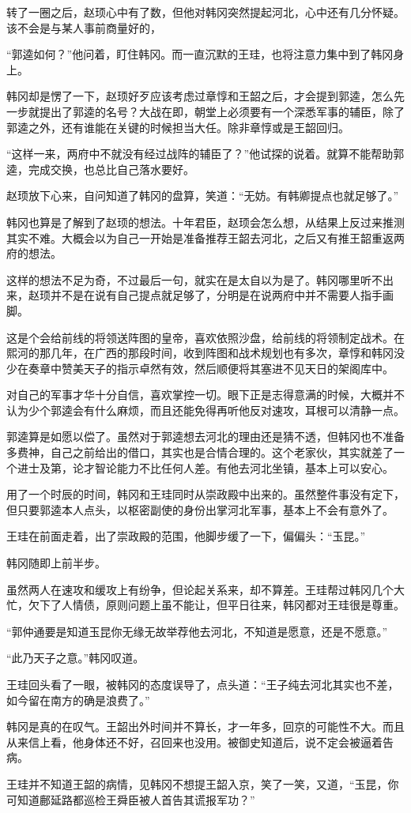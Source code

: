 转了一圈之后，赵顼心中有了数，但他对韩冈突然提起河北，心中还有几分怀疑。该不会是与某人事前商量好的，

“郭逵如何？”他问着，盯住韩冈。而一直沉默的王珪，也将注意力集中到了韩冈身上。

韩冈却是愣了一下，赵顼好歹应该考虑过章惇和王韶之后，才会提到郭逵，怎么先一步就提出了郭逵的名号？大战在即，朝堂上必须要有一个深悉军事的辅臣，除了郭逵之外，还有谁能在关键的时候担当大任。除非章惇或是王韶回归。

“这样一来，两府中不就没有经过战阵的辅臣了？”他试探的说着。就算不能帮助郭逵，完成交换，也总比自己落水要好。

赵顼放下心来，自问知道了韩冈的盘算，笑道：“无妨。有韩卿提点也就足够了。”

韩冈也算是了解到了赵顼的想法。十年君臣，赵顼会怎么想，从结果上反过来推测其实不难。大概会以为自己一开始是准备推荐王韶去河北，之后又有推王韶重返两府的想法。

这样的想法不足为奇，不过最后一句，就实在是太自以为是了。韩冈哪里听不出来，赵顼并不是在说有自己提点就足够了，分明是在说两府中并不需要人指手画脚。

这是个会给前线的将领送阵图的皇帝，喜欢依照沙盘，给前线的将领制定战术。在熙河的那几年，在广西的那段时间，收到阵图和战术规划也有多次，章惇和韩冈没少在奏章中赞美天子的指示卓然有效，然后顺便将其塞进不见天日的架阁库中。

对自己的军事才华十分自信，喜欢掌控一切。眼下正是志得意满的时候，大概并不认为少个郭逵会有什么麻烦，而且还能免得再听他反对速攻，耳根可以清静一点。

郭逵算是如愿以偿了。虽然对于郭逵想去河北的理由还是猜不透，但韩冈也不准备多费神，自己之前给出的借口，其实也是合情合理的。这个老家伙，其实就差了一个进士及第，论才智论能力不比任何人差。有他去河北坐镇，基本上可以安心。

用了一个时辰的时间，韩冈和王珪同时从崇政殿中出来的。虽然整件事没有定下，但只要郭逵本人点头，以枢密副使的身份出掌河北军事，基本上不会有意外了。

王珪在前面走着，出了崇政殿的范围，他脚步缓了一下，偏偏头：“玉昆。”

韩冈随即上前半步。

虽然两人在速攻和缓攻上有纷争，但论起关系来，却不算差。王珪帮过韩冈几个大忙，欠下了人情债，原则问题上虽不能让，但平日往来，韩冈都对王珪很是尊重。

“郭仲通要是知道玉昆你无缘无故举荐他去河北，不知道是愿意，还是不愿意。”

“此乃天子之意。”韩冈叹道。

王珪回头看了一眼，被韩冈的态度误导了，点头道：“王子纯去河北其实也不差，如今留在南方的确是浪费了。”

韩冈是真的在叹气。王韶出外时间并不算长，才一年多，回京的可能性不大。而且从来信上看，他身体还不好，召回来也没用。被御史知道后，说不定会被逼着告病。

王珪并不知道王韶的病情，见韩冈不想提王韶入京，笑了一笑，又道，“玉昆，你可知道鄜延路都巡检王舜臣被人首告其谎报军功？”

